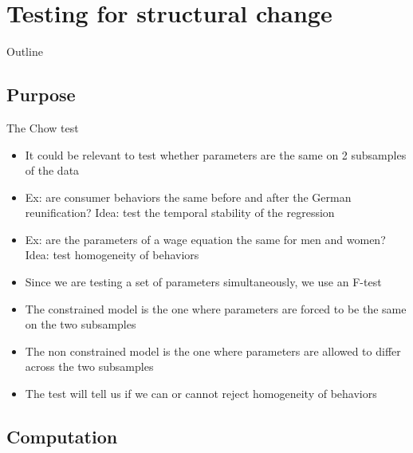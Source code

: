 \documentclass[aspectratio=169]{beamer}
\begin{document}
\section{Testing for structural change}

\begin{frame}{Outline}
\end{frame}

\subsection{Purpose}

\begin{frame}{The Chow test}
\begin{itemize}
    \item It could be relevant to test whether parameters are the same on 2 subsamples of the data
    \item Ex: are consumer behaviors the same before and after the German reunification? Idea: test the temporal stability of the regression
    \item Ex: are the parameters of a wage equation the same for men and women? Idea: test homogeneity of behaviors
    \item Since we are testing a set of parameters simultaneously, we use an F-test
    \item The constrained model is the one where parameters are forced to be the same on the two subsamples
    \item The non constrained model is the one where parameters are allowed to differ across the two subsamples
    \item The test will tell us if we can or cannot reject homogeneity of behaviors
\end{itemize}
\end{frame}

\subsection{Computation}
\end{document}
